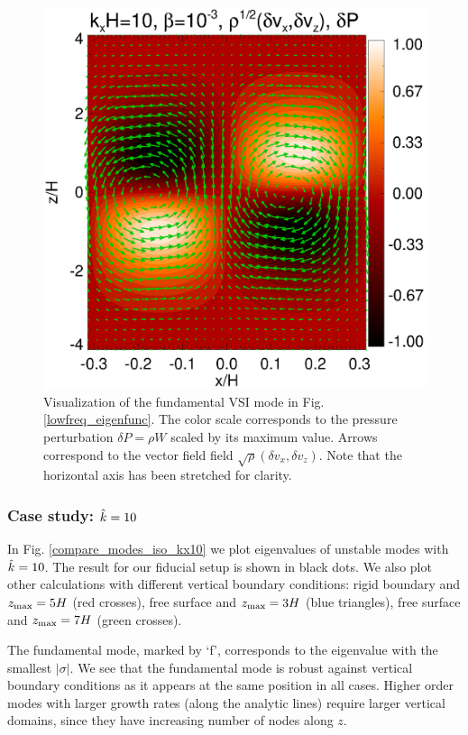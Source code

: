 \begin{figure}
  \includegraphics[width=\linewidth]{figures/result2d_iso}
  \caption{Visualization of the fundamental VSI mode in
    Fig. \ref{lowfreq_eigenfunc}. The color scale corresponds to the
    pressure perturbation $\delta P=\rho W$ scaled by its maximum value.
    Arrows correspond to the vector field field $\sqrt{\rho}(\delta
    v_x,\delta v_z)$. Note that the horizontal axis has been stretched 
    for clarity.  
    \label{lowfreq_eigenfunc_2d}
  }
\end{figure}


\subsubsection{Case study: $\hat{k}=10$}
In Fig. \ref{compare_modes_iso_kx10} we plot eigenvalues of unstable 
modes with $\hat{k}=10$. The result for our fiducial setup is shown
in black dots. We also plot other calculations with different
vertical boundary conditions: rigid boundary and $z_\mathrm{max}=5H$ (red
crosses),  free surface and $z_\mathrm{max} = 3H$ (blue triangles), free surface
and $z_\mathrm{max}=7H$ (green crosses). 

The fundamental mode, marked by `f', corresponds to the eigenvalue
with the smallest $|\sigma|$. We see that the fundamental mode is
robust against vertical boundary conditions as it appears at the same
position in all cases. Higher order modes with larger growth rates
(along the analytic lines) require larger vertical domains, since they
have increasing number of nodes along $z$. 

